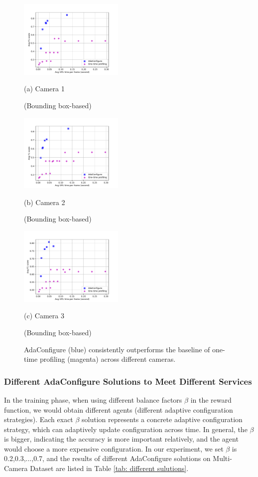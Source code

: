 \begin{figure}[!t]
	\begin{minipage}[t]{0.47\linewidth}
		\centerline{\includegraphics[width=5cm]{figures/Westbound.pdf}}
		\centerline{(a) Camera 1 }%
	\centerline{(Bounding box-based)}
	\end{minipage}
	\hfill
	\begin{minipage}[t]{0.47\linewidth}
		\centerline{\includegraphics[width=5cm]{figures/Eastbound.pdf}}
		\centerline{(b) Camera 2 }%
	\centerline{(Bounding box-based)}
	\end{minipage}
	\vfill
	\begin{minipage}[t]{\linewidth}
		\centerline{\includegraphics[width=5cm]{figures/Rear.pdf}}
		\centerline{(c) Camera 3 }%
	\centerline{(Bounding box-based)}
	\end{minipage}		
	\caption{AdaConfigure (blue) consistently outperforms the baseline of one-time profiling (magenta) across different cameras.}
	\label{fig: 3dataset results}
\end{figure}

\subsubsection{Different AdaConfigure Solutions to Meet Different Services}
\label{subsec: different sulutions}
In the training phase, when using different balance factors $\beta$ in the reward function, we would obtain different agents (different adaptive configuration strategies). Each exact $\beta$ solution represents a concrete adaptive configuration strategy, which can adaptively update configuration across time. In general, the $\beta$ is bigger, indicating the accuracy is more important relatively, and the agent would choose a more expensive configuration. In our experiment, we set $\beta$ is 0.2,0.3,...,0.7, and the results of different AdaConfigure solutions on Multi-Camera Dataset are listed in Table \ref{tab: different sulutions}. 

